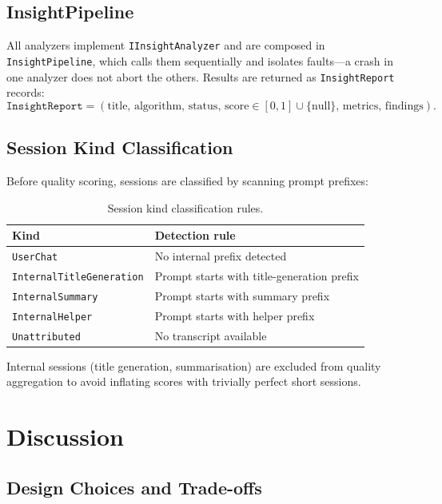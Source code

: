\documentclass[11pt,a4paper]{article}
\begin{document}
\subsection{InsightPipeline}

All analyzers implement \texttt{IInsightAnalyzer} and are composed in
\texttt{InsightPipeline}, which calls them sequentially and isolates
faults---a crash in one analyzer does not abort the others.  Results are
returned as \texttt{InsightReport} records:
\[
  \texttt{InsightReport} = (\text{title},\, \text{algorithm},\, \text{status},\,
    \text{score} \in [0,1] \cup \{\text{null}\},\, \text{metrics},\, \text{findings}).
\]

\subsection{Session Kind Classification}

Before quality scoring, sessions are classified by scanning prompt prefixes:

\begin{table}[h!]
\centering
\caption{Session kind classification rules.}
\begin{tabular}{@{}ll@{}}
\toprule
Kind & Detection rule \\
\midrule
\texttt{UserChat} & No internal prefix detected \\
\texttt{InternalTitleGeneration} & Prompt starts with title-generation prefix \\
\texttt{InternalSummary} & Prompt starts with summary prefix \\
\texttt{InternalHelper} & Prompt starts with helper prefix \\
\texttt{Unattributed} & No transcript available \\
\bottomrule
\end{tabular}
\end{table}

Internal sessions (title generation, summarisation) are excluded from
quality aggregation to avoid inflating scores with trivially perfect
short sessions.

\section{Discussion}
\label{sec:discussion}

\subsection{Design Choices and Trade-offs}
\end{document}
